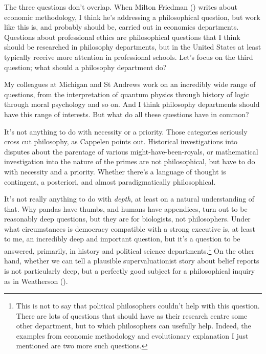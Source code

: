 \documentclass[
  10pt,
  letterpaper,
  DIV=11,
  numbers=noendperiod,
  twoside]{scrartcl}
\begin{document}
The three questions don't overlap. When Milton Friedman
() writes about economic methodology, I
think he's addressing a philosophical question, but work like this is,
and probably should be, carried out in economics departments. Questions
about professional ethics are philosophical questions that I think
should be researched in philosophy departments, but in the United States
at least typically receive more attention in professional schools. Let's
focus on the third question; what should a philosophy department do?

My colleagues at Michigan and St Andrews work on an incredibly wide
range of questions, from the interpretation of quantum physics through
history of logic through moral psychology and so on. And I think
philosophy departments should have this range of interests. But what do
all these questions have in common?

It's not anything to do with necessity or a priority. Those categories
seriously cross cut philosophy, as Cappelen points out. Historical
investigations into disputes about the parentage of various
might-have-been-royals, or mathematical investigation into the nature of
the primes are not philosophical, but have to do with necessity and a
priority. Whether there's a language of thought is contingent, a
posteriori, and almost paradigmatically philosophical.

It's not really anything to do with \emph{depth}, at least on a natural
understanding of that. Why pandas have thumbs, and humans have
appendices, turn out to be reasonably deep questions, but they are for
biologists, not philosophers. Under what circumstances is democracy
compatible with a strong executive is, at least to me, an incredibly
deep and important question, but it's a question to be answered,
primarily, in history and political science departments.\footnote{This
  is not to say that political philosophers couldn't help with this
  question. There are lots of questions that should have as their
  research centre some other department, but to which philosophers can
  usefully help. Indeed, the examples from economic methodology and
  evolutionary explanation I just mentioned are two more such questions.}
On the other hand, whether we can tell a plausible supervaluationist
story about belief reports is not particularly deep, but a perfectly
good subject for a philosophical inquiry as in Weatherson
().
\end{document}
